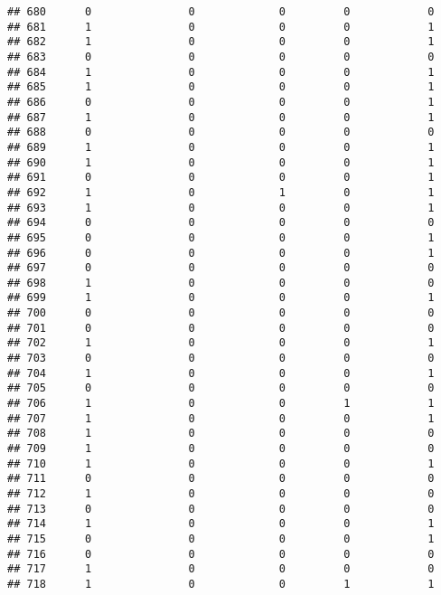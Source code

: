 \documentclass[]{article}
\begin{document}
\begin{verbatim}
## 680      0               0             0         0            0
## 681      1               0             0         0            1
## 682      1               0             0         0            1
## 683      0               0             0         0            0
## 684      1               0             0         0            1
## 685      1               0             0         0            1
## 686      0               0             0         0            1
## 687      1               0             0         0            1
## 688      0               0             0         0            0
## 689      1               0             0         0            1
## 690      1               0             0         0            1
## 691      0               0             0         0            1
## 692      1               0             1         0            1
## 693      1               0             0         0            1
## 694      0               0             0         0            0
## 695      0               0             0         0            1
## 696      0               0             0         0            1
## 697      0               0             0         0            0
## 698      1               0             0         0            0
## 699      1               0             0         0            1
## 700      0               0             0         0            0
## 701      0               0             0         0            0
## 702      1               0             0         0            1
## 703      0               0             0         0            0
## 704      1               0             0         0            1
## 705      0               0             0         0            0
## 706      1               0             0         1            1
## 707      1               0             0         0            1
## 708      1               0             0         0            0
## 709      1               0             0         0            0
## 710      1               0             0         0            1
## 711      0               0             0         0            0
## 712      1               0             0         0            0
## 713      0               0             0         0            0
## 714      1               0             0         0            1
## 715      0               0             0         0            1
## 716      0               0             0         0            0
## 717      1               0             0         0            0
## 718      1               0             0         1            1

\end{verbatim}
\end{document}
